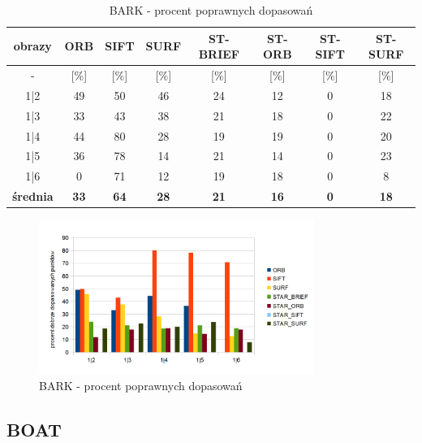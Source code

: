\begin{table}[htbp]
  \centering
  \caption{BARK - procent poprawnych dopasowań}
    \begin{tabular}{|c|c|c|c|c|c|c|c|}\hline
    obrazy & \textbf{ORB} & \textbf{SIFT} & \textbf{SURF} & \textbf{ST-BRIEF} & \textbf{ST-ORB} & \textbf{ST-SIFT} & \textbf{ST-SURF} \\\hline
     - & [\%] & [\%] & [\%] & [\%] & [\%] & [\%] & [\%] \\\hline
    1|2 & 49 & 50 & 46 & 24 & 12 & 0 & 18 \\
    1|3 & 33 & 43 & 38 & 21 & 18 & 0 & 22 \\
    1|4 & 44 & 80 & 28 & 19 & 19 & 0 & 20 \\
    1|5 & 36 & 78 & 14 & 21 & 14 & 0 & 23 \\
    1|6 & 0 & 71 & 12 & 19 & 18 & 0 & 8 \\\hline
    \textbf{średnia} & \textbf{33} & \textbf{64} & \textbf{28} & \textbf{21} & \textbf{16} & \textbf{0} & \textbf{18} \\\hline
    \end{tabular}%
  \label{tab:bark_m2}%
\end{table}%


\begin{figure}
\centering
\includegraphics[width=0.8\textwidth]{pict/mikolajczyk/bark/m2.png}
\caption{BARK - procent poprawnych dopasowań}
\label{fig:bark_m2}
\end{figure}






\FloatBarrier
\subsection{BOAT}

